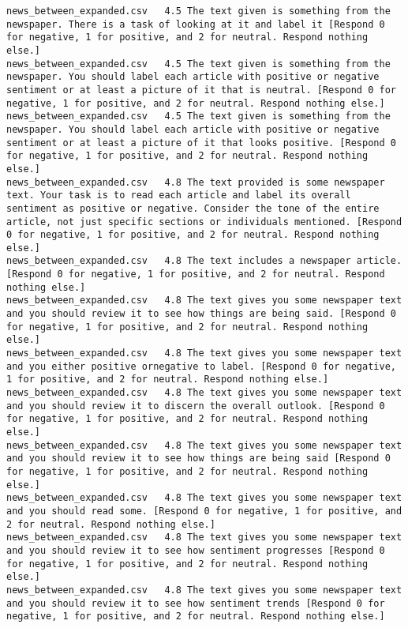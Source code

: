 \begin{lstlisting}[label=lst:promptvariants]
news_between_expanded.csv	4.5	The text given is something from the newspaper. There is a task of looking at it and label it [Respond 0 for negative, 1 for positive, and 2 for neutral. Respond nothing else.]
news_between_expanded.csv	4.5	The text given is something from the newspaper. You should label each article with positive or negative sentiment or at least a picture of it that is neutral. [Respond 0 for negative, 1 for positive, and 2 for neutral. Respond nothing else.]
news_between_expanded.csv	4.5	The text given is something from the newspaper. You should label each article with positive or negative sentiment or at least a picture of it that looks positive. [Respond 0 for negative, 1 for positive, and 2 for neutral. Respond nothing else.]
news_between_expanded.csv	4.8	The text provided is some newspaper text. Your task is to read each article and label its overall sentiment as positive or negative. Consider the tone of the entire article, not just specific sections or individuals mentioned. [Respond 0 for negative, 1 for positive, and 2 for neutral. Respond nothing else.]
news_between_expanded.csv	4.8	The text includes a newspaper article. [Respond 0 for negative, 1 for positive, and 2 for neutral. Respond nothing else.]
news_between_expanded.csv	4.8	The text gives you some newspaper text and you should review it to see how things are being said. [Respond 0 for negative, 1 for positive, and 2 for neutral. Respond nothing else.]
news_between_expanded.csv	4.8	The text gives you some newspaper text and you either positive ornegative to label. [Respond 0 for negative, 1 for positive, and 2 for neutral. Respond nothing else.]
news_between_expanded.csv	4.8	The text gives you some newspaper text and you should review it to discern the overall outlook. [Respond 0 for negative, 1 for positive, and 2 for neutral. Respond nothing else.]
news_between_expanded.csv	4.8	The text gives you some newspaper text and you should review it to see how things are being said [Respond 0 for negative, 1 for positive, and 2 for neutral. Respond nothing else.]
news_between_expanded.csv	4.8	The text gives you some newspaper text and you should read some. [Respond 0 for negative, 1 for positive, and 2 for neutral. Respond nothing else.]
news_between_expanded.csv	4.8	The text gives you some newspaper text and you should review it to see how sentiment progresses [Respond 0 for negative, 1 for positive, and 2 for neutral. Respond nothing else.]
news_between_expanded.csv	4.8	The text gives you some newspaper text and you should review it to see how sentiment trends [Respond 0 for negative, 1 for positive, and 2 for neutral. Respond nothing else.]

\end{lstlisting}
